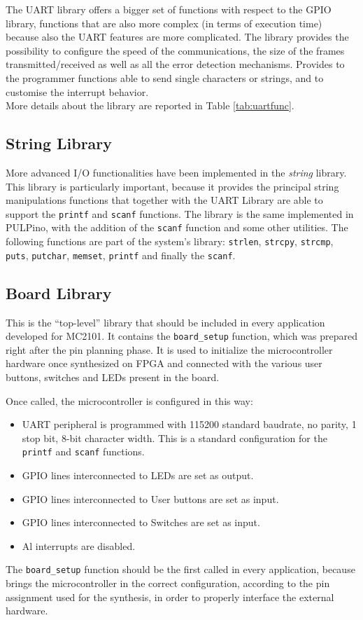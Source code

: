 The UART library offers a bigger set of functions with respect to the GPIO library, functions that are also more complex (in terms of execution time) because also the UART features are more complicated. The library provides the possibility to configure the speed of the communications, the size of the frames transmitted/received as well as all the error detection mechanisms. Provides to the programmer functions able to send single characters or strings, and to customise the interrupt behavior.\\
More details about the library are reported in Table \ref{tab:uartfunc}.

\subsection{String Library}
More advanced I/O functionalities have been implemented in the \emph{string} library. This library is particularly important, because it provides the principal string manipulations functions that together with the UART Library are able to support the \texttt{printf} and \texttt{scanf} functions. The library is the same implemented in PULPino, with the addition of the \texttt{scanf} function and some other utilities. The following functions are part of the system's library:
\texttt{strlen}, \texttt{strcpy}, \texttt{strcmp}, \texttt{puts}, \texttt{putchar}, \texttt{memset}, \texttt{printf} and finally the \texttt{scanf}.

\subsection{Board Library}
This is the ``top-level'' library that should be included in every application developed for MC2101. It contains the \texttt{board\_setup} function, which was prepared right after the pin planning phase. It is used to initialize the microcontroller hardware once synthesized on FPGA and connected with the various user buttons, switches and LEDs present in the board.

Once called, the microcontroller is configured in this way:
\begin{itemize}
\item UART peripheral is programmed with 115200 standard baudrate, no parity, 1 stop bit, 8-bit character width. This is a standard configuration for the \texttt{printf} and \texttt{scanf} functions.
\item GPIO lines interconnected to LEDs are set as output.
\item GPIO lines interconnected to User buttons are set as input.
\item GPIO lines interconnected to Switches are set as input.
\item Al interrupts are disabled.
\end{itemize}
The \texttt{board\_setup} function should be the first called in every application, because brings the microcontroller in the correct configuration, according to the pin assignment used for the synthesis, in order to properly interface the external hardware.

